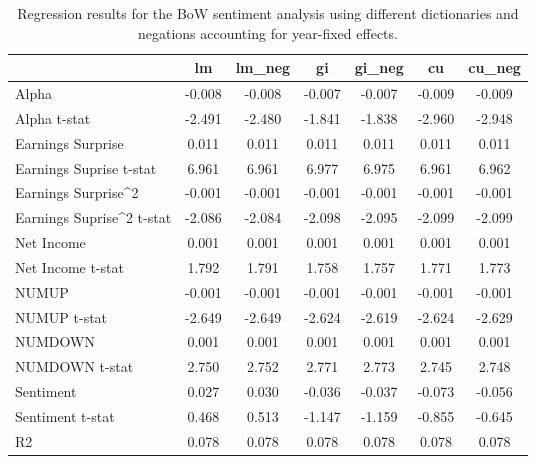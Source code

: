\begin{table}
\caption{Regression results for the BoW sentiment analysis using different dictionaries and negations accounting for year-fixed effects.}
\label{tab:bow_regressions_year_fixed}
\begin{tabular}{lcccccc}
\toprule
 & lm & lm_neg & gi & gi_neg & cu & cu_neg \\
\midrule
Alpha & -0.008 & -0.008 & -0.007 & -0.007 & -0.009 & -0.009 \\
Alpha t-stat & -2.491 & -2.480 & -1.841 & -1.838 & -2.960 & -2.948 \\
Earnings Surprise & 0.011 & 0.011 & 0.011 & 0.011 & 0.011 & 0.011 \\
Earnings Suprise t-stat & 6.961 & 6.961 & 6.977 & 6.975 & 6.961 & 6.962 \\
Earnings Surprise^2 & -0.001 & -0.001 & -0.001 & -0.001 & -0.001 & -0.001 \\
Earnings Suprise^2 t-stat & -2.086 & -2.084 & -2.098 & -2.095 & -2.099 & -2.099 \\
Net Income & 0.001 & 0.001 & 0.001 & 0.001 & 0.001 & 0.001 \\
Net Income t-stat & 1.792 & 1.791 & 1.758 & 1.757 & 1.771 & 1.773 \\
NUMUP & -0.001 & -0.001 & -0.001 & -0.001 & -0.001 & -0.001 \\
NUMUP t-stat & -2.649 & -2.649 & -2.624 & -2.619 & -2.624 & -2.629 \\
NUMDOWN & 0.001 & 0.001 & 0.001 & 0.001 & 0.001 & 0.001 \\
NUMDOWN t-stat & 2.750 & 2.752 & 2.771 & 2.773 & 2.745 & 2.748 \\
Sentiment & 0.027 & 0.030 & -0.036 & -0.037 & -0.073 & -0.056 \\
Sentiment t-stat & 0.468 & 0.513 & -1.147 & -1.159 & -0.855 & -0.645 \\
R2 & 0.078 & 0.078 & 0.078 & 0.078 & 0.078 & 0.078 \\
\bottomrule
\end{tabular}
\end{table}
